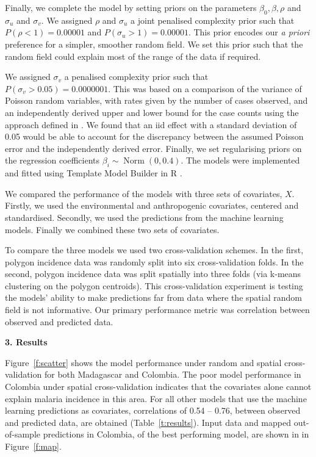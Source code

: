 \documentclass[11pt]{article}
\begin{document}
Finally, we complete the model by setting priors on the parameters $\beta_0, \beta, \rho$ and $\sigma_u$ and $\sigma_v$. 
We assigned $\rho$ and $\sigma_u$ a joint penalised complexity prior \citep{fuglstad2018constructing} such that $P(\rho < 1) = 0.00001$ and $P(\sigma_u > 1) = 0.00001$. 
This prior encodes our \emph{a priori} preference for a simpler, smoother random field.
We set this prior such that the random field could explain most of the range of the data if required.

We assigned $\sigma_v$ a penalised complexity prior \citep{simpson2017penalising} such that $P(\sigma_v > 0.05) = 0.0000001$. 
This was based on a comparison of the variance of Poisson random variables, with rates given by the number of cases observed, and an independently derived upper and lower bound for the case counts using the approach defined in \citep{cibulskis2011worldwide}. 
We found that an iid effect with a standard deviation of 0.05 would be able to account for the discrepancy between the assumed Poisson error and the independently derived error.
Finally, we set regularising priors on the regression coefficients $\beta_i \sim \operatorname{ Norm}(0, 0.4)$. 
The models were implemented and fitted using Template Model Builder \citep{TMB} in R \citep{R}.

We compared the performance of the models with three sets of covariates, $X$.
Firstly, we used the environmental and anthropogenic covariates, centered and standardised.
Secondly, we used the predictions from the machine learning models.
Finally we combined these two sets of covariates.

To compare the three models we used two cross-validation schemes. 
In the first, polygon incidence data was randomly split into six cross-validation folds.
In the second, polygon incidence data was split spatially into three folds (via k-means clustering on the polygon centroids).
This cross-validation experiment is testing the models’ ability to make predictions far from data where the spatial random field is not informative.
Our primary performance metric was correlation between observed and predicted data.


{\bf 3. Results}

Figure~\ref{f:scatter} shows the model performance under random and spatial cross-validation for both Madagascar and Colombia. 
The poor model performance in Colombia under spatial cross-validation indicates that the covariates alone cannot explain malaria incidence in this area. 
For all other models that use the machine learning predictions as covariates, correlations of 0.54 -- 0.76, between observed and predicted data, are obtained (Table~\ref{t:results}).
Input data and mapped out-of-sample predictions in Colombia, of the best performing model, are shown in in Figure~\ref{f:map}.
\end{document}
